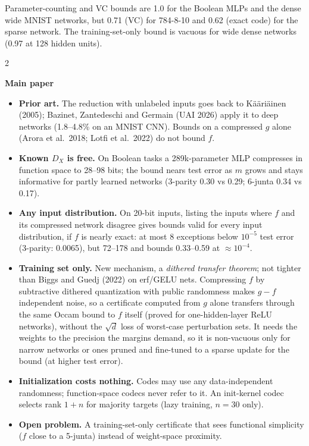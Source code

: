 \documentclass[10pt,a4paper]{article}
\newcommand{\head}[1]{\par{\large\bfseries #1}\par\smallskip}
\newcommand{\sub}[1]{{\bfseries #1}\enspace}
\begin{document}
{\footnotesize Parameter-counting and VC bounds are 1.0 for the Boolean MLPs and the dense wide MNIST networks, but 0.71 (VC) for 784-8-10 and 0.62 (exact code) for the sparse network. The training-set-only bound is vacuous for wide dense networks (0.97 at 128 hidden units).}

\raggedcolumns
\begin{multicols}{2}
\head{Main paper}
\begin{itemize}
\item \sub{Prior art.} The reduction with unlabeled inputs goes back to K\"a\"ari\"ainen (2005); Bazinet, Zantedeschi and Germain (UAI 2026) apply it to deep networks (1.8--4.8\% on an MNIST CNN). Bounds on a compressed $g$ alone (Arora et al.\ 2018; Lotfi et al.\ 2022) do not bound $f$.
\item \sub{Known $D_X$ is free.} On Boolean tasks a 289k-parameter MLP compresses in function space to 28--98 bits; the bound nears test error as $m$ grows and stays informative for partly learned networks (3-parity 0.30 vs 0.29; 6-junta 0.34 vs 0.17).
\item \sub{Any input distribution.} On 20-bit inputs, listing the inputs where $f$ and its compressed network disagree gives bounds valid for every input distribution, if $f$ is nearly exact: at most 8 exceptions below $10^{-5}$ test error (3-parity: 0.0065), but 72--178 and bounds 0.33--0.59 at ${\approx}10^{-4}$.
\item \sub{Training set only.} New mechanism, a \emph{dithered transfer theorem}; not tighter than Biggs and Guedj (2022) on erf/GELU nets. Compressing $f$ by subtractive dithered quantization with public randomness makes $g-f$ independent noise, so a certificate computed from $g$ alone transfers through the same Occam bound to $f$ itself (proved for one-hidden-layer ReLU networks), without the $\sqrt d$ loss of worst-case perturbation sets. It needs the weights to the precision the margins demand, so it is non-vacuous only for narrow networks or ones pruned and fine-tuned to a sparse update for the bound (at higher test error).
\item \sub{Initialization costs nothing.} Codes may use any data-independent randomness; function-space codecs never refer to it. An init-kernel codec selects rank $1+n$ for majority targets (lazy training, $n=30$ only).
\item \sub{Open problem.} A training-set-only certificate that sees functional simplicity ($f$ close to a 5-junta) instead of weight-space proximity.
\end{itemize}


\end{multicols}
\end{document}
